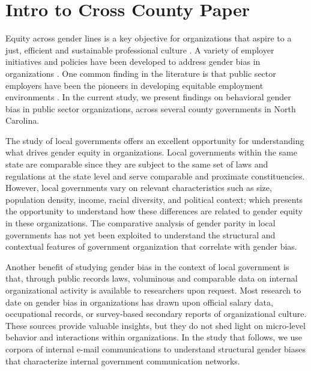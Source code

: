\documentclass[fleqn]{MJDArticle}
\begin{document}
\appendix

\section{Intro to Cross County Paper}
\label{sec:ccp intro}
Equity across gender lines is a key objective for organizations that aspire to a just, efficient and sustainable professional culture \citep{Ely2000}. A variety of employer initiatives and policies have been developed to address gender bias in organizations \citep{ Misra2007}. One common finding in the literature is that public sector employers have been the pioneers in developing equitable employment environments \citep{Buelens2007}. In the current study, we present findings on behavioral gender bias in public sector organizations, across several county governments in North Carolina.

The study of local governments offers an excellent opportunity for understanding what drives gender equity in organizations. Local governments within the same state are comparable since they are subject to the same set of laws and regulations at the state level and serve comparable and proximate constituencies. However, local governments vary on relevant characteristics such as size, population density, income, racial diversity, and political context; which presents the opportunity to understand how these differences are related to gender equity in these organizations. The comparative analysis of gender parity in local governments has not yet been exploited to understand the structural and contextual features of government organization that correlate with gender bias.

Another benefit of studying gender bias in the context of local government is that, through public records laws, voluminous and comparable data on internal organizational activity is available to researchers upon request. Most research to date on gender bias in organizations has drawn upon official salary data, occupational records, or survey-based secondary reports of organizational culture. These sources provide valuable insights, but they do not shed light on micro-level behavior and interactions within organizations. In the study that follows, we use corpora of internal e-mail communications to understand structural gender biases that characterize internal government communication networks.



\end{document}
